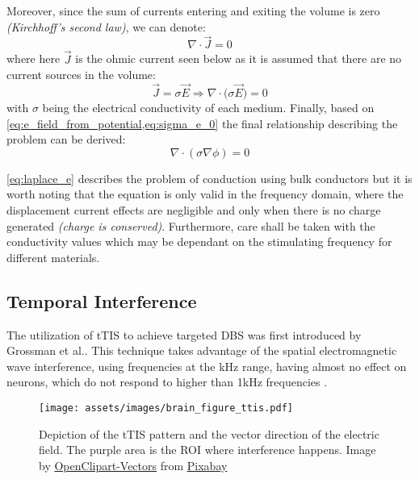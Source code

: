 \noindent Moreover, since the sum of currents entering and exiting the volume is zero \textit{(Kirchhoff's second law)}, we can denote:
\begin{equation}
    \nabla\cdot\vec{J} = 0
\end{equation}
where here $\vec{J}$ is the ohmic current seen below as it is assumed that there are no current sources in the volume:
\begin{equation}
    \label{eq:sigma_e_0}
    \vec{J} = \sigma\vec{E}\Rightarrow\boxed{\nabla\cdot\big(\sigma\vec{E}\big) = 0}
\end{equation}
with $\sigma$ being the electrical conductivity of each medium. Finally, based on \cref{eq:e_field_from_potential,eq:sigma_e_0} the final relationship describing the problem can be derived:
\begin{equation}
    \label{eq:laplace_e}
    \boxed{\nabla\cdot(\sigma\nabla\phi) = 0}
\end{equation}

\autoref{eq:laplace_e} describes the problem of conduction using bulk conductors but it is worth noting that the equation is only valid in the frequency domain, where the displacement current effects are negligible and only when there is no charge generated \textit{(charge is conserved)}. Furthermore, care shall be taken with the conductivity values which may be dependant on the stimulating frequency for different materials.

\pagebreak
\subsection{Temporal Interference}
The utilization of \gls{tTIS} to achieve targeted \gls{DBS} was first introduced by Grossman et al.\cite{Grossman2017}. This technique takes advantage of the spatial electromagnetic wave interference, using frequencies at the \si{kHz} range, having almost no effect on neurons, which do not respond to higher than 1\si{kHz} frequencies \cite{Hutcheon2000}.
\\\vspace{1pt}

\begin{wrapfigure}{r}{0.48\textwidth}
    \vspace{-10pt}
    \centering
    \texttt{[image: assets/images/brain\_figure\_ttis.pdf]}
    \caption[Depiction of the \gls{tTIS} pattern and the vector direction of the electric field. The purple area is the \gls{ROI} where interference happens.]{Depiction of the \gls{tTIS} pattern and the vector direction of the electric field. The purple area is the \gls{ROI} where interference happens. Image by \href{https://pixabay.com/users/openclipart-vectors-30363/?utm_source=link-attribution&amp;utm_medium=referral&amp;utm_campaign=image&amp;utm_content=150935}{OpenClipart-Vectors} from \href{https://pixabay.com/?utm_source=link-attribution&amp;utm_medium=referral&amp;utm_campaign=image&amp;utm_content=150935}{Pixabay}}
    \label{fig:brain_elec_demo}
\end{wrapfigure}

